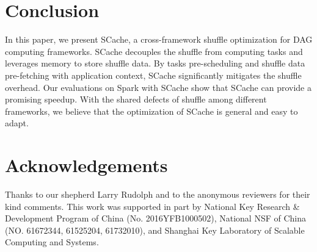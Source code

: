 \section{Conclusion}
In this paper, we present SCache, a cross-framework shuffle optimization for DAG computing frameworks. 
SCache decouples the shuffle from computing tasks and leverages memory to store shuffle data. 
By tasks pre-scheduling and shuffle data pre-fetching with application context, SCache significantly mitigates the shuffle overhead. 
Our evaluations on Spark with SCache show that SCache can provide a promising speedup. 
With the shared defects of shuffle among different frameworks, we believe that the optimization of SCache is general and easy to adapt. 

\section{Acknowledgements}
Thanks to our shepherd  Larry Rudolph and to the anonymous reviewers for their kind comments. This work was supported in part by National Key Research \& Development Program of China (No. 2016YFB1000502), National NSF of China (NO. 61672344, 61525204, 61732010), and Shanghai Key Laboratory of Scalable Computing and Systems.